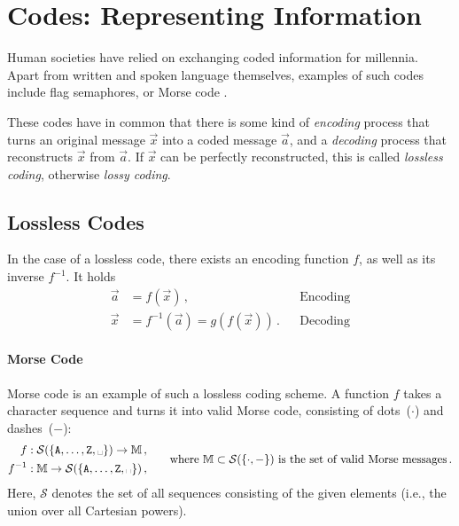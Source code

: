 \documentclass[10pt,letterpaper,oneside]{article}
\begin{document}
\section{Codes: Representing Information}

Human societies have relied on exchanging coded information for millennia. Apart from written and spoken language themselves, examples of such codes include flag semaphores, or Morse code \cite{2009itur}.

These codes have in common that there is some kind of \emph{encoding} process that turns an original message $\vec x$ into a coded message $\vec a$, and a \emph{decoding} process that reconstructs $\vec x$ from $\vec a$. If $\vec x$ can be perfectly reconstructed, this is called \emph{lossless coding}, otherwise \emph{lossy coding}.

\subsection{Lossless Codes}

In the case of a lossless code, there exists an encoding function $f$, as well as its inverse $f^{-1}$. It holds
\begin{align*}
	\vec a &= f(\vec x) \,, && \text{Encoding} \\
	\vec x &= f^{-1}(\vec a) = g(f(\vec x)) \,. && \text{Decoding} 
\end{align*}

\paragraph{Morse Code} Morse code is an example of such a lossless coding scheme. A function $f$ takes a character sequence and turns it into valid Morse code, consisting of dots~($\cdot$) and dashes~($-$):
\begin{align*}
	\begin{aligned}
	f&: \mathcal{S}(\{\mathtt{A}, \ldots, \mathtt{Z}, \text{\textvisiblespace}\}) \rightarrow \mathbb{M} \,, \\
	f^{-1} &: \mathbb{M} \rightarrow \mathcal{S}(\{\mathtt{A}, \ldots, \mathtt{Z}, \text{\textvisiblespace}\}) \,,
	\end{aligned} &&\quad \text{where } \mathbb{M} \subset \mathcal{S}(\{\cdot, -\}) \text{ is the set of valid Morse messages} \,.
\end{align*}
Here, $\mathcal{S}$ denotes the set of all sequences consisting of the given elements (i.e., the union over all Cartesian powers).
\end{document}
